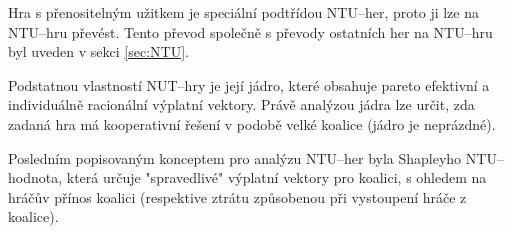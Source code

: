     Hra s přenositelným užitkem je speciální podtřídou NTU--her, proto ji lze na NTU--hru převést. Tento převod společně s převody ostatních her na NTU--hru byl uveden v sekci \ref{sec:NTU}.

    Podstatnou vlastností NUT--hry je její jádro, které obsahuje pareto efektivní a individuálně racionální výplatní vektory. Právě analýzou jádra lze určit, zda zadaná hra má kooperativní řešení v podobě velké koalice (jádro je neprázdné).

    Posledním popisovaným konceptem pro analýzu NTU--her byla Shapleyho NTU--hodnota, která určuje "spravedlivé" výplatní vektory pro koalici, s ohledem na hráčův přínos koalici (respektive ztrátu způsobenou při vystoupení hráče z koalice).
